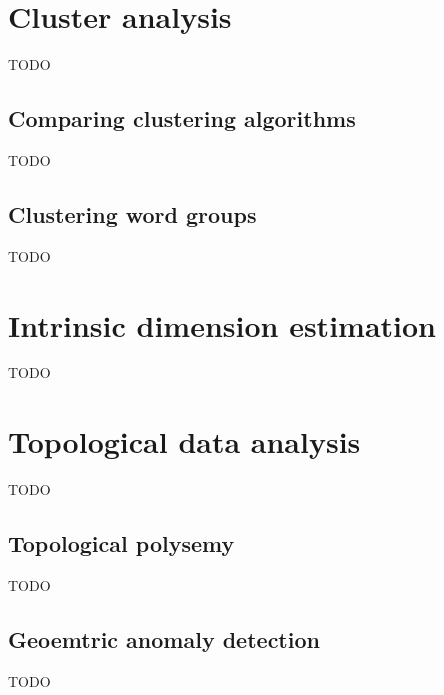 \section{Cluster analysis}
TODO

\subsection{Comparing clustering algorithms}
TODO

\subsection{Clustering word groups}
TODO

\section{Intrinsic dimension estimation}
TODO

\section{Topological data analysis}
TODO

\subsection{Topological polysemy}
TODO

\subsection{Geoemtric anomaly detection}
TODO
